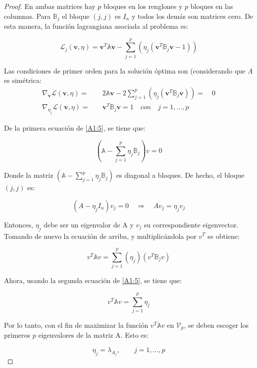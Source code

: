 \begin{proof}
En ambas matrices hay $p$ bloques en los renglones y $p$ bloques en las columnas. Para $\mathbb{B}_j$ el bloque $(j,j)$ es $I_n$ y todos los demás son matrices cero. De esta manera, la función lagrangiana asociada al problema es:

\begin{equation*}
\mathcal{L}_j(\mathbf{v}, \eta) = \mathbf{v}^T \mathbb{A} \mathbf{v} - \sum\limits_{j=1}^{p}(\eta_j(\mathbf{v}^T\mathbb{B}_j\mathbf{v}-1))
\end{equation*}

Las condiciones de primer orden para la solución óptima son (considerando que $A$ es simétrica:
\begin{equation}\label{A1:5}
\begin{aligned}
	\nabla_{\mathbf{v}} \mathcal{L}(\mathbf{v}, \eta) =& \quad 2 \mathbb{A}\mathbf{v} - 2 \sum\limits_{j=1}^p (\eta_j(\mathbf{v}^T \mathbb{B}_j \mathbf{v})) = \quad 0 \\
	\nabla_{\eta_j} \mathcal{L}(\mathbf{v}, \eta)  =& \quad \mathbf{v}^T \mathbb{B}_j \mathbf{v} = 1 \quad con \quad j = 1, ...,p 
\end{aligned}
\end{equation}

De la primera ecuación de \ref{A1:5}, se tiene que:

\begin{equation*}
	\left(\mathbb{A}-\sum\limits_{j=1}^p \eta_j \mathbb{B}_j \right) v = 0
\end{equation*}

Donde la matriz $(\mathbb{A}-\sum\limits_{j=1}^p \eta_j \mathbb{B}_j)$ es diagonal a bloques. De hecho, el bloque $(j,j)$ es:

\begin{equation*}
(A-\eta_j I_n)v_j = 0 \quad \Rightarrow \quad Av_j = \eta_j v_j	
\end{equation*}

Entonces, $\eta_j$ debe ser un eigenvalor de A y $v_j$ su correspondiente eigenvector. Tomando de nuevo la ecuación de arriba, y multiplicándola por $v^T$ se obtiene:

\begin{equation*}
v^T \mathbb{A}v = \sum\limits_{j=1}^p (\eta_j)(v^T \mathbb{B}_j v)	
\end{equation*}

Ahora, usando la segunda ecuación de \ref{A1:5}, se tiene que:

\begin{equation*}
	v^T \mathbb{A}v = \sum\limits_{j=1}^p \eta_j
\end{equation*}

Por lo tanto, con el fin de maximizar la función $v^T \mathbb{A} v$ en $\mathcal{V}_p$, se deben escoger los primeros $p$ eigenvalores de la matriz A. Esto es:

\begin{equation*}
	\eta_j = \lambda_{A_j}, \qquad j = 1, ..., p
\end{equation*}

\end{proof}


